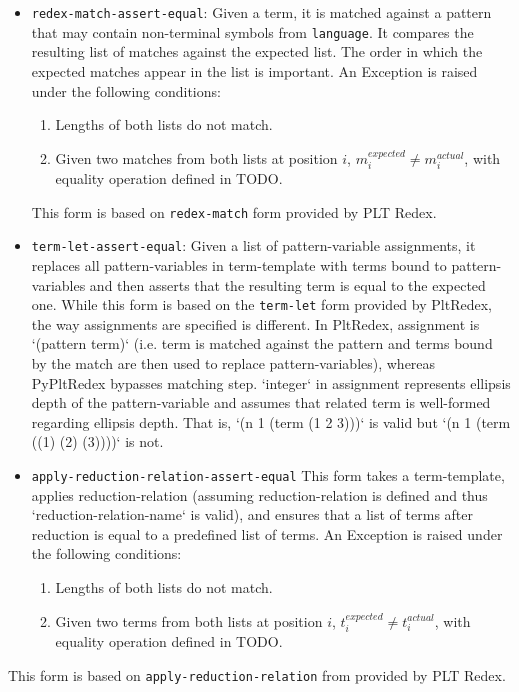 \begin{itemize}
\item 
\texttt{redex-match-assert-equal}: Given a term, it is matched against a pattern that may contain non-terminal symbols from \texttt{language}. It compares the resulting list of matches against the expected list. The order in which the expected matches appear in the list is important. An Exception is raised under the following conditions:
	\begin{enumerate}
	\item Lengths of both lists do not match.
	\item Given two matches from both lists at position $i$, $m_i^{expected} \neq m_i^{actual}$, with equality operation defined in TODO.
	\end{enumerate}
	This form is based on \texttt{redex-match} form provided by PLT Redex.


\item 
\texttt{term-let-assert-equal}: Given a list of pattern-variable assignments, it replaces all pattern-variables in term-template with terms bound to pattern-variables and then asserts that the resulting term is equal to the expected one.  While this form is based on the \texttt{term-let} form provided by PltRedex, the way assignments are specified is different. In PltRedex, assignment is `(pattern term)` (i.e. term is matched against the pattern and terms bound by the match are then used to replace pattern-variables), whereas PyPltRedex bypasses matching step. `integer` in assignment represents ellipsis depth of the pattern-variable and assumes that related term is well-formed regarding ellipsis depth. That is, `(n 1 (term (1 2 3)))` is valid but `(n 1 (term ((1) (2) (3))))` is not.

\item 
\texttt{apply-reduction-relation-assert-equal} This form takes a term-template, applies reduction-relation (assuming reduction-relation is defined and thus `reduction-relation-name` is valid), and ensures that a list of terms after reduction is equal to a predefined list of terms. An Exception is raised under the following conditions:

	\begin{enumerate}
	\item Lengths of both lists do not match.
	\item Given two terms from both lists at position $i$, $t_i^{expected} \neq t_i^{actual}$, with equality operation defined in TODO.
	\end{enumerate}
\end{itemize}
This form is based on \texttt{apply-reduction-relation} from provided by PLT Redex.
